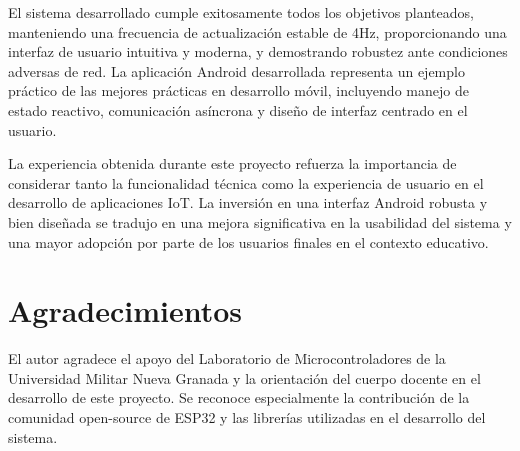 \documentclass[conference,a4paper]{IEEEtran}
\begin{document}
El sistema desarrollado cumple exitosamente todos los objetivos planteados, manteniendo una frecuencia de actualización estable de 4Hz, proporcionando una interfaz de usuario intuitiva y moderna, y demostrando robustez ante condiciones adversas de red. La aplicaci\'on Android desarrollada representa un ejemplo pr\'actico de las mejores pr\'acticas en desarrollo m\'ovil, incluyendo manejo de estado reactivo, comunicaci\'on as\'incrona y dise\~{n}o de interfaz centrado en el usuario.

La experiencia obtenida durante este proyecto refuerza la importancia de considerar tanto la funcionalidad t\'ecnica como la experiencia de usuario en el desarrollo de aplicaciones IoT. La inversi\'on en una interfaz Android robusta y bien dise\~{n}ada se tradujo en una mejora significativa en la usabilidad del sistema y una mayor adopci\'on por parte de los usuarios finales en el contexto educativo.

\section{Agradecimientos}

El autor agradece el apoyo del Laboratorio de Microcontroladores de la Universidad Militar Nueva Granada y la orientación del cuerpo docente en el desarrollo de este proyecto. Se reconoce especialmente la contribución de la comunidad open-source de ESP32 y las librerías utilizadas en el desarrollo del sistema.
\end{document}
